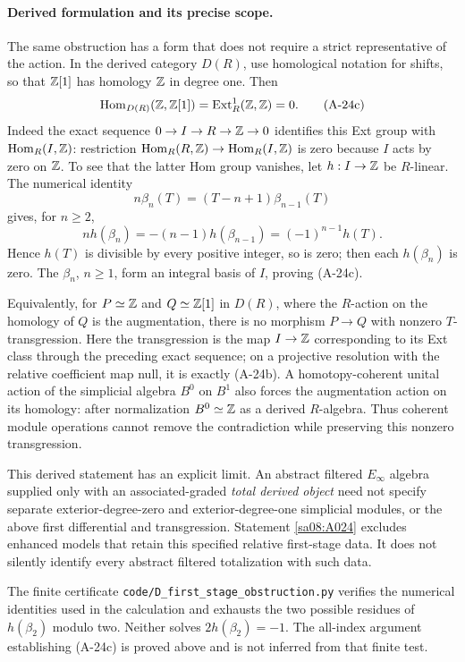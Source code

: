 \paragraph{Derived formulation and its precise scope.}
The same obstruction has a form that does not require a strict
representative of the action. In the derived category $D(R)$, use
homological notation for shifts, so that $\mathbb Z[1]$ has homology
$\mathbb Z$ in degree one. Then
\[
 \operatorname{Hom}_{D(R)}(\mathbb Z,\mathbb Z[1])
   =\operatorname{Ext}^1_R(\mathbb Z,\mathbb Z)=0.
 \tag{A-24c}
\]
Indeed the exact sequence $0\to I\to R\to\mathbb Z\to0$ identifies
this Ext group with $\operatorname{Hom}_R(I,\mathbb Z)$: restriction
$\operatorname{Hom}_R(R,\mathbb Z)\to\operatorname{Hom}_R(I,\mathbb Z)$ is
zero because $I$ acts by zero on $\mathbb Z$. To see that the latter Hom
group vanishes, let $h:I\to\mathbb Z$ be $R$-linear. The numerical identity
\[
 n\beta_n(T)=(T-n+1)\beta_{n-1}(T)
\]
gives, for $n\ge2$,
\[
 n h(\beta_n)=-(n-1)h(\beta_{n-1})
             =(-1)^{n-1}h(T).
\]
Hence $h(T)$ is divisible by every positive integer, so is zero;
then each $h(\beta_n)$ is zero. The $\beta_n$, $n\ge1$, form
an integral basis of $I$, proving (A-24c).

Equivalently, for $P\simeq\mathbb Z$ and $Q\simeq\mathbb Z[1]$ in $D(R)$,
where the $R$-action on the homology of $Q$ is the augmentation,
there is no morphism $P\to Q$ with nonzero $T$-transgression.
Here the transgression is the map
$I\to\mathbb Z$ corresponding to its Ext class through the preceding
exact sequence; on a projective resolution with the relative
coefficient map null, it is exactly (A-24b).
A homotopy-coherent unital action of the simplicial algebra $B^0$
on $B^1$ also forces the augmentation action on its homology:
after normalization $B^0\simeq\mathbb Z$ as a derived $R$-algebra.
Thus coherent module operations cannot remove the contradiction
while preserving this nonzero transgression.

This derived statement has an explicit limit. An abstract filtered
$E_\infty$ algebra supplied only with an associated-graded
\emph{total derived object} need not specify separate
exterior-degree-zero and exterior-degree-one simplicial modules,
or the above first differential and transgression. Statement
\ref{sa08:A024} excludes enhanced models that retain this specified
relative first-stage data. It does not silently identify every
abstract filtered totalization with such data.

The finite certificate
\texttt{code/D\_first\_stage\_obstruction.py} verifies the numerical
identities used in the calculation and exhausts the two possible
residues of $h(\beta_2)$ modulo two. Neither solves
$2h(\beta_2)=-1$. The all-index argument establishing (A-24c) is
proved above and is not inferred from that finite test.
